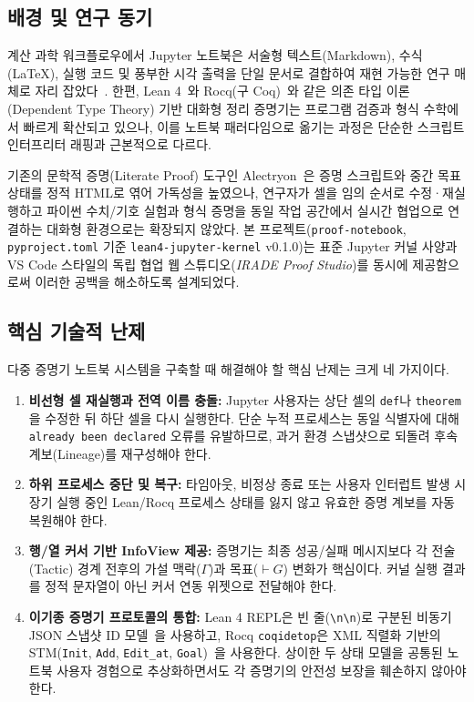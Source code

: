 \documentclass[journal]{IEEEtran}
\newcommand{\code}[1]{\texttt{#1}}
\begin{document}
\subsection{배경 및 연구 동기}
계산 과학 워크플로우에서 Jupyter 노트북은 서술형 텍스트(Markdown), 수식(\LaTeX), 실행 코드 및 풍부한 시각 출력을 단일 문서로 결합하여 재현 가능한 연구 매체로 자리 잡았다~\cite{kluyver2016jupyter}. 한편, Lean 4~\cite{moura2021lean4}와 Rocq(구 Coq)~\cite{barras2015asynchronous}와 같은 의존 타입 이론(Dependent Type Theory) 기반 대화형 정리 증명기는 프로그램 검증과 형식 수학에서 빠르게 확산되고 있으나, 이를 노트북 패러다임으로 옮기는 과정은 단순한 스크립트 인터프리터 래핑과 근본적으로 다르다.

기존의 문학적 증명(Literate Proof) 도구인 Alectryon~\cite{pitclaudel2020alectryon}은 증명 스크립트와 중간 목표 상태를 정적 HTML로 엮어 가독성을 높였으나, 연구자가 셀을 임의 순서로 수정·재실행하고 파이썬 수치/기호 실험과 형식 증명을 동일 작업 공간에서 실시간 협업으로 연결하는 대화형 환경으로는 확장되지 않았다. 본 프로젝트(\code{proof-notebook}, \code{pyproject.toml} 기준 \code{lean4-jupyter-kernel} v0.1.0)는 표준 Jupyter 커널 사양과 VS Code 스타일의 독립 협업 웹 스튜디오(\textit{IRADE Proof Studio})를 동시에 제공함으로써 이러한 공백을 해소하도록 설계되었다.

\subsection{핵심 기술적 난제}
다중 증명기 노트북 시스템을 구축할 때 해결해야 할 핵심 난제는 크게 네 가지이다.
\begin{enumerate}
  \item \textbf{비선형 셀 재실행과 전역 이름 충돌:} Jupyter 사용자는 상단 셀의 \code{def}나 \code{theorem}을 수정한 뒤 하단 셀을 다시 실행한다. 단순 누적 프로세스는 동일 식별자에 대해 \code{already been declared} 오류를 유발하므로, 과거 환경 스냅샷으로 되돌려 후속 계보(Lineage)를 재구성해야 한다.
  \item \textbf{하위 프로세스 중단 및 복구:} 타임아웃, 비정상 종료 또는 사용자 인터럽트 발생 시 장기 실행 중인 Lean/Rocq 프로세스 상태를 잃지 않고 유효한 증명 계보를 자동 복원해야 한다.
  \item \textbf{행/열 커서 기반 InfoView 제공:} 증명기는 최종 성공/실패 메시지보다 각 전술(Tactic) 경계 전후의 가설 맥락($\Gamma$)과 목표($\vdash G$) 변화가 핵심이다. 커널 실행 결과를 정적 문자열이 아닌 커서 연동 위젯으로 전달해야 한다.
  \item \textbf{이기종 증명기 프로토콜의 통합:} Lean 4 REPL은 빈 줄(\code{\textbackslash n\textbackslash n})로 구분된 비동기 JSON 스냅샷 ID 모델~\cite{morrison_repl}을 사용하고, Rocq \code{coqidetop}은 XML 직렬화 기반의 STM(\code{Init}, \code{Add}, \code{Edit\_at}, \code{Goal})~\cite{barras2015asynchronous}을 사용한다. 상이한 두 상태 모델을 공통된 노트북 사용자 경험으로 추상화하면서도 각 증명기의 안전성 보장을 훼손하지 않아야 한다.
\end{enumerate}
\end{document}
